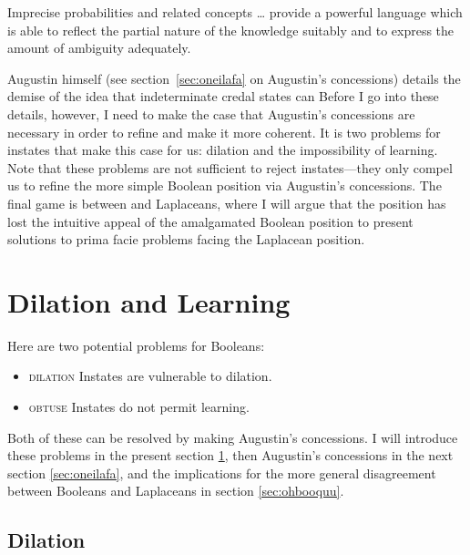 \documentclass[phd,12pt,oneside]{ubcthesis}
\begin{document}
\begin{quotex}
  Imprecise probabilities and related concepts {\ldots} provide a
  powerful language which is able to reflect the partial nature of the
  knowledge suitably and to express the amount of ambiguity
  adequately. 
\end{quotex}

Augustin himself (see section~\ref{sec:oneilafa} on Augustin's
concessions) details the demise of the idea that indeterminate credal
states can  Before
I go into these details, however, I need to make the case that
Augustin's concessions are necessary in order to refine {\anderson}
and make it more coherent. It is two problems for instates that make
this case for us: dilation and the impossibility of learning. Note
that these problems are not sufficient to reject instates---they only
compel us to refine the more simple Boolean position via Augustin's
concessions. The final game is between {\augustin} and Laplaceans,
where I will argue that the {\augustin} position has lost the
intuitive appeal of the amalgamated Boolean position to present
solutions to prima facie problems facing the Laplacean position.

\section{Dilation and Learning}
\label{sec:aequahfo}

Here are two potential problems for Booleans:

\begin{itemize}
\item \textsc{dilation} Instates are vulnerable to dilation.
\item \textsc{obtuse} Instates do not permit learning.
\end{itemize}

{\noindent}Both of these can be resolved by making Augustin's concessions. I will
introduce these problems in the present section \ref{sec:aequahfo},
then Augustin's concessions in the next section \ref{sec:oneilafa},
and the implications for the more general disagreement between
Booleans and Laplaceans in section \ref{sec:ohbooquu}.

\subsection{Dilation}
\label{subsec:aejoorau}
\end{document}
